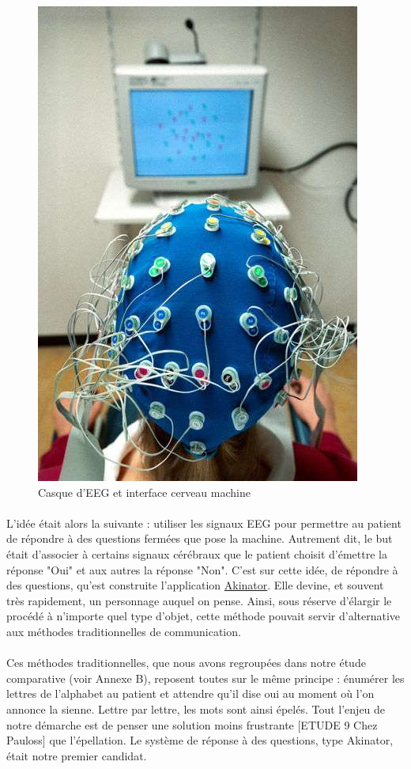 \documentclass[11pt,a4paper]{article}
\theoremstyle{plain}
\theoremstyle{definition}
\begin{document}
\begin{figure}[ht]
\centering
\includegraphics[scale=0.3]{images/electroencephalogramme.jpg}
\caption{Casque d'EEG et interface cerveau machine}
\label{eeg}
\end{figure}

\paragraph{} L'idée était alors la suivante : utiliser les signaux EEG pour permettre au patient de répondre à des questions fermées que pose la machine.
Autrement dit, le but était d'associer à certains signaux cérébraux que le patient choisit d'émettre la réponse "Oui" et aux autres la réponse "Non". 
C'est sur cette idée, de répondre à des questions, qu'est construite l'application \href{http://fr.akinator.com/}{Akinator}. Elle devine, et souvent très rapidement, 
un personnage auquel on pense. Ainsi, sous réserve d'élargir le procédé à n'importe quel type d'objet, cette méthode pouvait servir d'alternative aux méthodes traditionnelles de communication.

\paragraph{} Ces méthodes traditionnelles, que nous avons regroupées dans notre étude comparative (voir Annexe B), reposent toutes sur le même principe : énumérer les
lettres de l'alphabet au patient et attendre qu'il dise oui au moment où l'on annonce la sienne. Lettre par lettre, les mots sont ainsi épelés. Tout l'enjeu de notre démarche est de penser une solution moins frustrante [ETUDE 9 Chez Pauloss] que l'épellation. Le système de réponse à des questions, type Akinator, était notre premier candidat.
\end{document}
